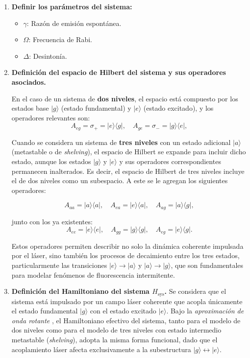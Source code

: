 \documentclass[12pt]{report}
\begin{document}
\begin{enumerate} \item \textbf{Definir los parámetros del sistema:} \begin{itemize} \item $\gamma$: Raz\'on de emisi\'on espont\'anea. 
\item $\Omega$: Frecuencia de Rabi. \item $\Delta$: Desintonía. %
\end{itemize}

\item \textbf{Definición del espacio de Hilbert del sistema y sus operadores asociados.}

En el caso de un sistema de \textbf{dos niveles}, el espacio está compuesto por los estados base \( |g\rangle \) (estado fundamental) y \( |e\rangle \) (estado excitado), y los operadores relevantes son:
\[
A_{eg} = \sigma_+=|e\rangle\langle g|, \quad A_{ge} = \sigma_-= |g\rangle\langle e|, 
\]

Cuando se considera un sistema de \textbf{tres niveles} con un estado adicional \( |a\rangle \) (metastable o de \textit{shelving}), el espacio de Hilbert se expande para incluir dicho estado, aunque los estados \( |g\rangle \) y \( |e\rangle \) y sus operadores correspondientes permanecen inalterados. Es decir, el espacio de Hilbert de tres niveles incluye el de dos niveles como un subespacio. A este se le agregan los siguientes operadores:

\[
A_{aa} = |a\rangle\langle a|, \quad A_{ea} = |e\rangle\langle a|, \quad A_{ag} = |a\rangle\langle g|,
\]

junto con los ya existentes:
\[
A_{ee} = |e\rangle\langle e|, \quad A_{gg} = |g\rangle\langle g|, \quad A_{eg} = |e\rangle\langle g|.
\]

Estos operadores permiten describir no solo la dinámica coherente impulsada por el láser, sino también los procesos de decaimiento entre los tres estados, particularmente las transiciones \( |e\rangle \to |a\rangle \) y \( |a\rangle \to |g\rangle \), que son fundamentales para modelar fenómenos de fluorescencia intermitente.




\item \textbf{Definición del Hamiltoniano del sistema \( H_{\text{sys}} \).}  
Se considera que el sistema está impulsado por un campo láser coherente que acopla únicamente el estado fundamental \( |g\rangle \) con el estado excitado \( |e\rangle \). Bajo la \textit{aproximación de onda rotante} , el Hamiltoniano efectivo del sistema, tanto para el modelo de dos niveles como para el modelo de tres niveles con estado intermedio metastable (\textit{shelving}), adopta la misma forma funcional, dado que el acoplamiento láser afecta exclusivamente a la subestructura \( |g\rangle \leftrightarrow |e\rangle \).


\end{enumerate}
\end{document}
